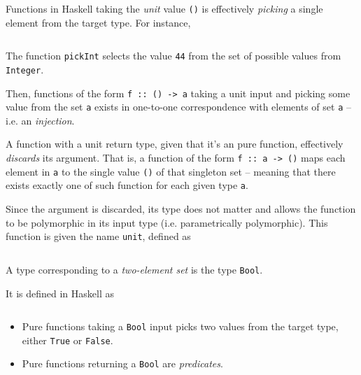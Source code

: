 \begin{remark}
    Functions in Haskell taking the \textit{unit} value \texttt{()} is effectively \textit{picking} a single element from the target type. For instance,
    \inputminted{hs}{content/code-listings/unit-example.hs}
    The function \texttt{pickInt} selects the value \texttt{44} from the set of possible values from \texttt{Integer}.
    
    Then, functions of the form \texttt{f :: () -> a} taking a unit input and picking some value from the set \texttt{a} exists in one-to-one correspondence with elements of set \texttt{a} -- i.e. an \textit{injection}.
    
    A function with a unit return type, given that it's an pure function, effectively \textit{discards} its argument. That is, a function of the form \texttt{f :: a -> ()} maps each element in \texttt{a} to the single value \texttt{()} of that singleton set -- meaning that there exists exactly one of such function for each given type \texttt{a}.
    
    Since the argument is discarded, its type does not matter and allows the function to be polymorphic in its input type (i.e. parametrically polymorphic). This function is given the name \texttt{unit}, defined as
    \inputminted{hs}{content/code-listings/unit.hs}
\end{remark}

\begin{definition}
    A type corresponding to a \textit{two-element set} is the type \texttt{Bool}.
    
    It is defined in Haskell as
    \inputminted{hs}{content/code-listings/bool.hs}
    
    \begin{itemize}
        \item Pure functions taking a \texttt{Bool} input picks two values from the target type, either \texttt{True} or \texttt{False}.
        \item Pure functions returning a \texttt{Bool} are \textit{predicates}.
    \end{itemize}
\end{definition}
